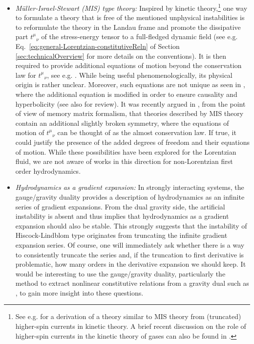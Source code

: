 \documentclass[superscriptaddress,prd,nofootinbib,preprintnumbers,longbibliography,11pt,eqsecnum]{revtex4-1}
\begin{document}
\begin{itemize}
  \item \textit{M\"uller-Israel-Stewart (MIS) type theory:} Inspired by kinetic theory,\footnote{See e.g. \cite{Romatschke:2009im} for a derivation of a theory similar to MIS theory from (truncated) higher-spin currents in kinetic theory. A brief recent discussion on the role of higher-spin currents in the kinetic theory of gases can also be found in \cite{Grozdanov:2018fic}.} one way to formulate a theory that is free of the mentioned unphysical instabilities is to reformulate the theory in the Landau frame and promote the dissipative part $t^{\mu}_{\;\;\,\nu}$ of the stress-energy tensor to a full-fledged dynamic field (see e.g. Eq.~\eqref{eq:general-Lorentzian-constitutiveReln} of Section \ref{sec:technicalOverview} for more details on the conventions). It is then required to provide additional equations of motion beyond the conservation law for $t^{\mu}_{\;\;\,\nu}$, see e.g. \cite{Muller:1967zza,Israel:1976tn,Israel:1979wp}. While being useful phenomenologically, its physical origin is rather unclear.  Moreover, such equations are not unique as seen in \cite{Liu:1986,Geroch:1990bw}, where the additional equation is modified in order to ensure causality and hyperbolicity (see also \cite{rezzolla2013relativistic} for review). It was recently argued in \cite{Grozdanov:2018fic}, from the point of view of memory matrix formalism, that theories described by MIS theory contain an additional slightly broken symmetry, where the equations of motion of $t^{\mu}_{\;\;\,\nu}$ can be thought of as the almost conservation law. If true, it could justify the presence of the added degrees of freedom and their equations of motion. While these possibilities have been explored for the Lorentzian fluid, we are not aware of works in this direction for non-Lorentzian first order hydrodynamics.  

  \item \textit{Hydrodynamics as a gradient expansion:} In strongly interacting systems,
the gauge/gravity duality provides a description of hydrodynamics as an infinite series of gradient expansions. From the dual gravity side, the artificial instability is absent and thus implies that hydrodynamics as a gradient expansion should also be stable. This strongly suggests that the instability of Hiscock-Lindblom type originates from truncating the infinite gradient expansion series. Of course, one will immediately ask whether there is a way to consistently truncate the series and, if the truncation to first derivative is problematic, how many orders in the derivative expansion we should keep. It would be interesting to use the gauge/gravity duality, particularly the method to extract nonlinear constitutive relations from a gravity dual such as \cite{Bhattacharyya:2008jc,Erdmenger:2008rm,Banerjee:2008th,Rangamani:2008gi,Brattan:2010bw,Kiritsis:2015doa,Kiritsis:2016rcb}, to gain more insight into these questions. 


\end{itemize}
\end{document}
